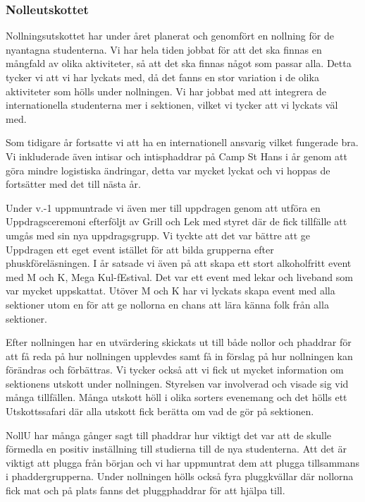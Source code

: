 \documentclass[../_main/handlingar.tex]{subfiles}
\begin{document}
\subsubsection*{Nolleutskottet}

Nollningsutskottet har under året planerat och genomfört en nollning för de nyantagna studenterna. Vi har hela tiden jobbat för att det ska finnas en mångfald av olika aktiviteter, så att det ska finnas något som passar alla. Detta tycker vi att vi har lyckats med, då det fanns en stor variation i de olika aktiviteter som hölls under nollningen. Vi har jobbat med att integrera de internationella studenterna mer i sektionen, vilket vi tycker att vi lyckats väl med. 

Som tidigare år fortsatte vi att ha en internationell ansvarig vilket fungerade bra. Vi inkluderade även intisar och intisphaddrar på Camp St Hans i år genom att göra mindre logistiska ändringar, detta var mycket lyckat och vi hoppas de fortsätter med det till nästa år.

Under v.-1 uppmuntrade vi även mer till uppdragen genom att utföra en Uppdragsceremoni efterföljt av Grill och Lek med styret där de fick tillfälle att umgås med sin nya uppdragsgrupp. Vi tyckte att det var bättre att ge Uppdragen ett eget event istället för att bilda grupperna efter phuskföreläsningen. I år satsade vi även på att skapa ett stort alkoholfritt event med M och K, Mega Kul-fEstival. Det var ett event med lekar och liveband som var mycket uppskattat. Utöver M och K har vi lyckats skapa event med alla sektioner utom en för att ge nollorna en chans att lära känna folk från alla sektioner.

Efter nollningen har en utvärdering skickats ut till både nollor och phaddrar för att få reda på hur nollningen upplevdes samt få in förslag på hur nollningen kan förändras och förbättras. Vi tycker också att vi fick ut mycket information om sektionens utskott under nollningen. Styrelsen var involverad och visade sig vid många tillfällen. Många utskott höll i olika sorters evenemang och det hölls ett Utskottssafari där alla utskott fick berätta om vad de gör på sektionen. 

NollU har många gånger sagt till phaddrar hur viktigt det var att de skulle förmedla en positiv inställning till studierna till de nya studenterna. Att det är viktigt att plugga från början och vi har uppmuntrat dem att plugga tillsammans i phaddergrupperna. Under nollningen hölls också fyra pluggkvällar där nollorna fick mat och på plats fanns det pluggphaddrar för att hjälpa till. 
\end{document}
